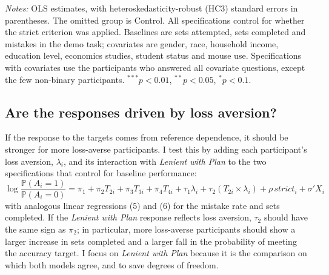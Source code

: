 \documentclass[12pt, letterpaper]{article}
\newcommand{\LPName}{Lenient with Plan}
\newcommand{\LP}{\textit{\LPName}}
\begin{document}
\begin{table}[htbp]
\centering
\caption{Treatment effects on sets completed (pooled sample)}\label{tab:reg-sets}
\begin{threeparttable}

\begin{tablenotes}[flushleft]
\footnotesize
\item \textit{Notes:} OLS estimates, with heteroskedasticity-robust (HC3) standard errors in parentheses. The omitted group is Control. All specifications control for whether the strict criterion was applied. Baselines are sets attempted, sets completed and mistakes in the demo task; covariates are gender, race, household income, education level, economics studies, student status and mouse use. Specifications with covariates use the participants who answered all covariate questions, except the few non-binary participants. $^{***}p<0.01$, $^{**}p<0.05$, $^{*}p<0.1$.
\end{tablenotes}
\end{threeparttable}
\end{table}

\subsection{Are the responses driven by loss aversion?}

If the response to the targets comes from reference dependence, it should be stronger for more loss-averse participants. I test this by adding each participant's loss aversion, $\lambda_i$, and its interaction with \LP{} to the two specifications that control for baseline performance:
\[
\log \frac{\mathbb{P}(A_i = 1)}{\mathbb{P}(A_i = 0)} = \pi_1 + \pi_2 T_{2i} + \pi_3 T_{3i} + \pi_4 T_{4i} + \tau_1 \lambda_i + \tau_2(T_{2i} \times \lambda_i) + \rho\, strict_i + \sigma' X_i \tag{4}
\]
with analogous linear regressions (5) and (6) for the mistake rate and sets completed. If the \LP{} response reflects loss aversion, $\tau_2$ should have the same sign as $\pi_2$; in particular, more loss-averse participants should show a larger increase in sets completed and a larger fall in the probability of meeting the accuracy target. I focus on \LP{} because it is the comparison on which both models agree, and to save degrees of freedom.
\end{document}
